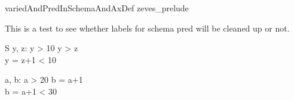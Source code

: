 \begin{zsection}
\SECTION variedAndPredInSchemaAndAxDef \parents zeves\_prelude
\end{zsection}

This is a test to see whether labels for schema pred will be cleaned up or not.
\begin{schema}{S}
   y, z: \nat
\where
   y > 10 \land y > z
\\
   y = z+1 < 10
\end{schema}


\begin{axdef}
   a, b: \nat
\where
   a > 20 \land  b = a+1
\\
   b = a+1 < 30
\end{axdef}